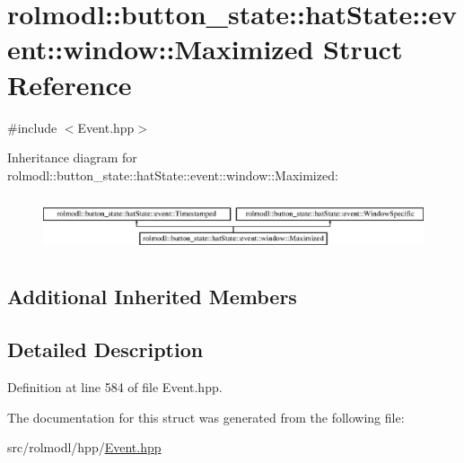 \hypertarget{structrolmodl_1_1button__state_1_1hat_state_1_1event_1_1window_1_1_maximized}{}\section{rolmodl\+::button\+\_\+state\+::hat\+State\+::event\+::window\+::Maximized Struct Reference}
\label{structrolmodl_1_1button__state_1_1hat_state_1_1event_1_1window_1_1_maximized}


{\ttfamily \#include $<$Event.\+hpp$>$}

Inheritance diagram for rolmodl\+::button\+\_\+state\+::hat\+State\+::event\+::window\+::Maximized\+:\begin{figure}[H]
\begin{center}
\leavevmode
\includegraphics[height=1.671642cm]{structrolmodl_1_1button__state_1_1hat_state_1_1event_1_1window_1_1_maximized}
\end{center}
\end{figure}
\subsection*{Additional Inherited Members}


\subsection{Detailed Description}


Definition at line 584 of file Event.\+hpp.



The documentation for this struct was generated from the following file\+:\begin{DoxyCompactItemize}
\item 
src/rolmodl/hpp/\mbox{\hyperlink{_event_8hpp}{Event.\+hpp}}\end{DoxyCompactItemize}
